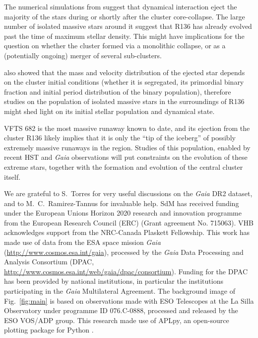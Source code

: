 \documentclass[apjl,twocolumn]{emulateapj}
\DeclareRobustCommand{\Figref}[1]{Fig.~\ref{#1}}
\begin{document}
The numerical simulations from \cite{oh:16} suggest that dynamical
interaction eject the majority of the stars during or shortly after the cluster
core-collapse. The large number of isolated massive stars around it
suggest that R136 has already evolved past the
time of maximum stellar density. This might have implications for the
question on whether the cluster formed via a monolithic collapse, or
as a (potentially ongoing) merger of several sub-clusters.

\citet{oh:16} also showed that the mass and velocity distribution of the ejected star depends on the cluster initial conditions
(whether it is segregated, its primordial binary fraction and initial period
distribution of the binary population), therefore studies on
the population of isolated massive stars in the surroundings of R136
might shed light on its initial stellar population and dynamical
state. 

VFTS 682 is the most massive runaway known to date, and its ejection
from the cluster R136 likely implies that it is only the ``tip of the
iceberg'' of possibly extremely massive runaways in the
region. Studies of this population, enabled by recent HST and \emph{Gaia} observations will put constraints on the evolution
of these extreme stars, together with the formation and evolution of
the central cluster itself.




\begin{acknowledgements}
  \small
  We are grateful to S.~Torres for 
  very useful discussions on the
  \emph{Gaia} DR2 dataset, and to M.~C.~Ramirez-Tannus for invaluable help.
  SdM has received funding under the European Unions Horizon 2020 research and innovation programme from the European Research
  Council (ERC) (Grant agreement No. 715063). VHB acknowledges support from the NRC-Canada Plaskett Fellowship.
  This work has made use of data from the ESA space mission \emph{Gaia} (\url{http://www.cosmos.esa.int/gaia}), processed by the \emph{Gaia} Data Processing and Analysis Consortium (DPAC, \url{http://www.cosmos.esa.int/web/gaia/dpac/consortium}). Funding for the DPAC has been provided by national institutions, in particular the institutions participating in the \emph{Gaia} Multilateral Agreement. 
  The background image of \Figref{fig:main} is based on observations
  made with ESO Telescopes at the La Silla Observatory under programme
  ID 076.C-0888, processed and released by the ESO VOS/ADP group.
  This research made use of APLpy, an open-source plotting package for Python \citep[][]{robitaille:12}.
\end{acknowledgements}
\end{document}
